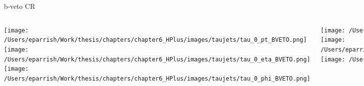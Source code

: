 \documentclass[aspectratio=169,xcolor=table]{beamer}
\begin{document}
    \begin{frame}[t]{b-veto CR}
      \begin{columns}[t]
          \texttt{[image: /Users/eparrish/Work/thesis/chapters/chapter6\_HPlus/images/taujets/tau\_0\_pt\_BVETO.png]}
          \texttt{[image: /Users/eparrish/Work/thesis/chapters/chapter6\_HPlus/images/taujets/tau\_0\_eta\_BVETO.png]}
          \texttt{[image: /Users/eparrish/Work/thesis/chapters/chapter6\_HPlus/images/taujets/tau\_0\_phi\_BVETO.png]}

          \texttt{[image: /Users/eparrish/Work/thesis/chapters/chapter6\_HPlus/images/taujets/tau\_0\_upsilon\_BVETO.png]}
          \texttt{[image: /Users/eparrish/Work/thesis/chapters/chapter6\_HPlus/images/taujets/tau\_0\_charged\_tracks\_0\_pt\_BVETO.png]}
          \texttt{[image: /Users/eparrish/Work/thesis/chapters/chapter6\_HPlus/images/taujets/n\_jets\_BVETO.png]}

          \texttt{[image: /Users/eparrish/Work/thesis/chapters/chapter6\_HPlus/images/taujets/met\_et\_BVETO.png]}
          \texttt{[image: /Users/eparrish/Work/thesis/chapters/chapter6\_HPlus/images/taujets/met\_phi\_BVETO.png]}
          \texttt{[image: /Users/eparrish/Work/thesis/chapters/chapter6\_HPlus/images/taujets/n\_bjets\_DL1r\_FixedCutBEff\_70\_BVETO.png]}

          \texttt{[image: /Users/eparrish/Work/thesis/chapters/chapter6\_HPlus/images/taujets/bjet\_0\_pt\_BVETO.png]}
          \texttt{[image: /Users/eparrish/Work/thesis/chapters/chapter6\_HPlus/images/taujets/bjet\_0\_eta\_BVETO.png]}
          \texttt{[image: /Users/eparrish/Work/thesis/chapters/chapter6\_HPlus/images/taujets/bjet\_0\_phi\_BVETO.png]}

      \end{columns}
    \end{frame}
\end{document}
